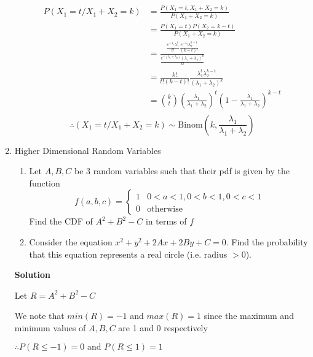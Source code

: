 \documentclass[12pt, oneside]{article}
\begin{document}
\begin{enumerate}
{    \begin{align*}
        P(X_1 = t / X_1 + X_2 = k) &= \frac{P(X_1 = t, X_1 + X_2 = k)}{P(X_1 + X_2 = k)} \\
            &= \frac{P(X_1 = t) P(X_2 = k - t)}{P(X_1 + X_2 = k)} \tag*{(Since \(X_1\) and \(X_2\) are independent)} \\
            &= \frac{\frac{e^{-\lambda_1} \lambda_1^t}{t!} \frac{e^{-\lambda_2} \lambda_2^{k-t}}{(k - t)!}}
                    {\frac{e^{-(\lambda_1 + \lambda_2)} (\lambda_1 + \lambda_2)^k}{k!}} 
                    \tag*{(Since \(X_1 + X_2 \sim P(\lambda_1 + \lambda_2)\))} \\
            &= \frac{k!}{t!(k - t)!} \frac{\lambda_1^t \lambda_2^{k-t}}{(\lambda_1 + \lambda_2)^k} \\
            &= {k \choose t} \left(\frac{\lambda_1}{\lambda_1 + \lambda_2}\right)^t \left(1 - \frac{\lambda_1}{\lambda_1 + \lambda_2}\right)^{k - t} \\
    \end{align*}
    \[\therefore (X_1 = t / X_1 + X_2 = k) \sim \text{Binom}\left(k, \frac{\lambda_1}{\lambda_1 + \lambda_2}\right)\]
}

\item {
    Higher Dimensional Random Variables

    \begin{enumerate}
        \item Let \(A, B, C\) be 3 random variables such that their pdf is given by the function
        \[
            f(a, b, c) = \begin{cases}
                            1 & 0 < a < 1, 0 < b < 1, 0 < c < 1 \\
                            0 & \text{otherwise}
                         \end{cases}
        \]
        Find the CDF of \(A^2 + B^2 - C\) in terms of \(f\)
        \item Consider the equation \(x^2 + y^2 + 2Ax + 2By + C = 0\). Find the probability
        that this equation represents a real circle (i.e. radius \(> 0\)).
    \end{enumerate}

    \textbf{Solution}

    Let \(R = A^2 + B^2 - C\)

    We note that \(min(R) = -1\) and \(max(R) = 1\) since the maximum and minimum values
    of \(A, B, C\) are 1 and 0 respectively

    \(\therefore P(R \leq -1) = 0 \text{ and } P(R \leq 1) = 1\)

}
\end{enumerate}
\end{document}
